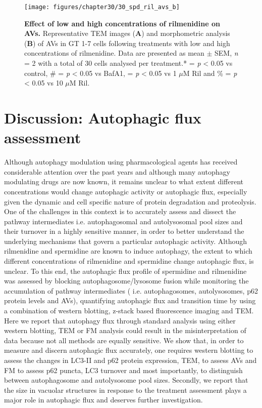 \begin{landscape}
\begin{figure}[!htbp]
\center
  \texttt{[image: figures/chapter30/30\_spd\_ril\_avs\_b]}
  \caption[Effect of low and high concentrations of rilmenidine on AVs]{\textbf{Effect of low and high concentrations of rilmenidine on AVs.} Representative TEM images (\textbf{A}) and morphometric analysis (\textbf{B}) of AVs in GT 1-7 cells following treatments with low and high concentrations of rilmenidine. Data are presented as mean $\pm$ SEM, \textit{n} = 2 with a total of 30 cells analysed per treatment.* = \textit{p} < 0.05 vs control, \# = \textit{p} < 0.05 vs BafA1, \@ = \textit{p} < 0.05 vs 1 $\mu$M Ril and  \% = \textit{p} < 0.05 vs 10 $\mu$M Ril.}
  \label{fig:30_spd_ril_avs_b}
\end{figure} 
\end{landscape}

\section{Discussion: Autophagic flux assessment}
Although autophagy modulation using pharmacological agents has received considerable attention over the past years and although many autophagy modulating drugs are now known, it remains unclear to what extent different concentrations would change autophagic activity or autophagic flux, especially given the dynamic and cell specific nature of protein degradation and proteolysis. One of the challenges in this context is to accurately assess and dissect the pathway intermediates i.e. autophagosomal and autolysosomal pool sizes and their turnover in a highly sensitive manner, in order to better understand the underlying mechanisms that govern a particular autophagic activity. Although rilmenidine and spermidine are known to induce autophagy, the extent to which different concentrations of rilmenidine and spermidine  change  autophagic flux, is unclear. To this end, the autophagic flux profile of spermidine and rilmenidine was assessed by blocking autophagosome/lysosome fusion while monitoring the accumulation of pathway intermediates ( i.e. autophagosomes, autolysosomes, p62 protein levels and AVs), quantifying autophagic flux and transition time by using a combination of western blotting, z-stack based fluorescence imaging and TEM. Here we report that autophagy flux through standard analysis using either western blotting, TEM or FM analysis could result in the misinterpretation of data because not all methods are equally sensitive. We show that, in order to measure and discern autophagic flux accurately, one requires western blotting to assess the changes in LC3-II and p62 protein expression, TEM, to assess AVs and FM to assess p62 puncta, LC3 turnover and most importantly, to distinguish between autophagosome and autolysosome pool sizes. Secondly, we report that the size in vacuolar structures in response to the treatment assessment plays a major role in autophagic flux and deserves further investigation.

